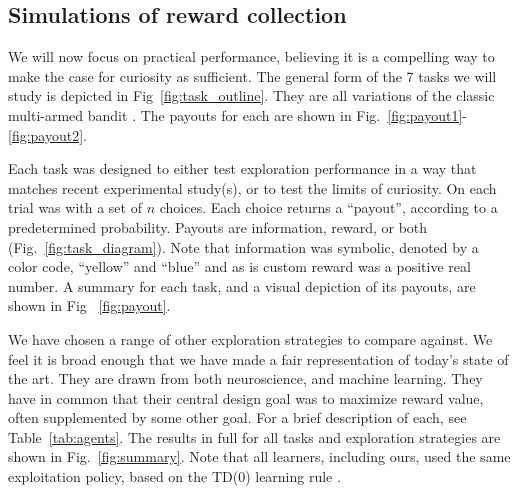 \subsection{Simulations of reward collection} We will now focus on practical performance, believing it is a compelling way to make the case for curiosity as sufficient. The general form of the 7 tasks we will study is depicted in Fig~\ref{fig:task_outline}. They are all variations of the classic multi-armed bandit \cite{Sutton2018}. The payouts for each are shown in Fig.~\ref{fig:payout1}-\ref{fig:payout2}. 

Each task was designed to either test exploration performance in a way that matches recent experimental study(s), or to test the limits of curiosity. On each trial was with a set of $n$ choices. Each choice returns a “payout”, according to a predetermined probability. Payouts are information, reward, or both (Fig.~\ref{fig:task_diagram}). Note that information was symbolic, denoted by a color code, “yellow” and “blue” and as is custom reward was a positive real number. A summary for each task, and a visual depiction of its payouts, are shown in Fig ~\ref{fig:payout}.

We have chosen a range of other exploration strategies to compare against. We feel it is broad enough that we have made a fair representation of today's state of the art. They are drawn from both neuroscience, and machine learning. They have in common that their central design goal was to maximize reward value, often supplemented by some other goal. For a brief description of each, see Table~\ref{tab:agents}. The results in full for all tasks and exploration strategies are shown in Fig.~\ref{fig:summary}. Note that all learners, including ours, used the same exploitation policy, based on the TD(0) learning rule \cite{Sutton2018,needed}.

